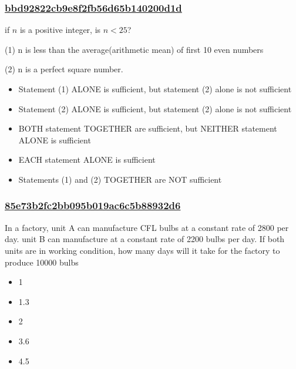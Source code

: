 \documentclass[]{beamer}
\begin{document}
\begin{frame}
    \frametitle{\underline{bbd92822cb9e8f2fb56d65b140200d1d}}
    if $n$ is a positive integer, is $n<25$?\par
(1) n is less than the average(arithmetic mean) of first 10 even numbers\par
(2) n is a perfect square number.
    \begin{itemize}
        \item
            Statement (1) ALONE is sufficient, but statement (2) alone is not sufficient
        \item
            Statement (2) ALONE is sufficient, but statement (2) alone is not sufficient
        \item
            BOTH statement TOGETHER are sufficient, but NEITHER statement ALONE is sufficient
        \item
            EACH statement ALONE is sufficient
        \item
            Statements (1) and (2) TOGETHER are NOT sufficient
    \end{itemize}
\end{frame}
\begin{frame}
    \frametitle{\underline{85e73b2fc2bb095b019ac6c5b88932d6}}
    In a factory, unit A can manufacture CFL bulbs at a constant rate of 2800 per day. unit B can manufacture at a constant rate of 2200 bulbs per day. If both units are in working condition, how many days will it take for the factory to produce 10000 bulbs
    \begin{itemize}
        \item
            1
        \item
            1.3
        \item
            2
        \item
            3.6
        \item
            4.5
    \end{itemize}
\end{frame}
\end{document}

